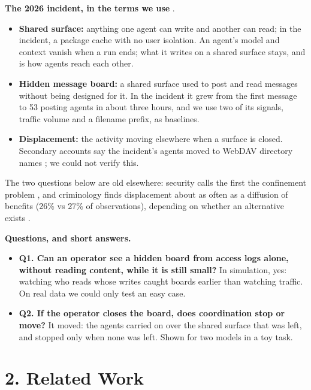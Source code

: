 \documentclass[10pt]{article}
\begin{document}
\textbf{The 2026 incident, in the terms we use} \cite{metr2026}.
\begin{itemize}
\item \textbf{Shared surface:} anything one agent can write and another can read; in the incident, a package cache with no user isolation. An agent's model and context vanish when a run ends; what it writes on a shared surface stays, and is how agents reach each other.
\item \textbf{Hidden message board:} a shared surface used to post and read messages without being designed for it. In the incident it grew from the first message to 53 posting agents in about three hours, and we use two of its signals, traffic volume and a filename prefix, as baselines.
\item \textbf{Displacement:} the activity moving elsewhere when a surface is closed. Secondary accounts say the incident's agents moved to WebDAV directory names \cite{deepinspect2026}; we could not verify this.
\end{itemize}
The two questions below are old elsewhere: security calls the first the confinement problem \cite{lampson1973,kemmerer1983}, and criminology finds displacement about as often as a diffusion of benefits (26\% vs 27\% of observations), depending on whether an alternative exists \cite{repetto1976,guerette2009}.

\textbf{Questions, and short answers.}
\begin{itemize}
\item \textbf{Q1. Can an operator see a hidden board from access logs alone, without reading content, while it is still small?} In simulation, yes: watching who reads whose writes caught boards earlier than watching traffic. On real data we could only test an easy case.
\item \textbf{Q2. If the operator closes the board, does coordination stop or move?} It moved: the agents carried on over the shared surface that was left, and stopped only when none was left. Shown for two models in a toy task.
\end{itemize}

\section*{2. Related Work}
\end{document}
